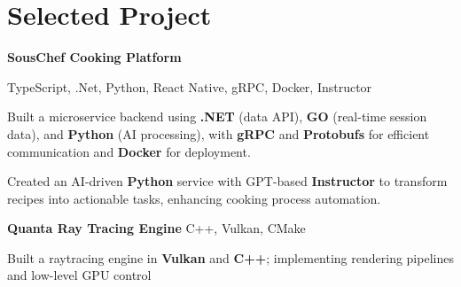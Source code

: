 
\newenvironment{twocolentry_proj}[2][]{
    \onecolentry
    \def\secondColumn{#2}
    \setcolumnwidth{\fill, 9 cm}
    \begin{paracol}{2}
}{
    \switchcolumn \raggedleft \secondColumn
    \end{paracol}
    \endonecolentry
} %

\vspace{5 pt - 0.4 cm}
\section{Selected Project}
\begin{twocolentry_proj}{
    \mbox{}%
}

\textbf{SousChef Cooking Platform}
\end{twocolentry_proj}

\vspace{0.10 cm}
\begin{onecolentry}
    \small TypeScript, .Net, Python, React Native, gRPC, Docker, Instructor 
    \begin{highlights}
        \item Built a microservice backend using  \textbf{.NET} (data API),  \textbf{GO} (real-time session data), and  \textbf{Python} (AI processing), with \textbf{gRPC} and \textbf{Protobufs} for efficient communication and \textbf{Docker} for deployment.
        \item Created an AI-driven  \textbf{Python} service with GPT-based \textbf{Instructor} to transform recipes into actionable tasks, enhancing cooking process automation.
    \end{highlights}
\end{onecolentry}


\vspace{0.10 cm}
\begin{twocolentry_proj}{
    \mbox{}%
}
\textbf{Quanta Ray Tracing Engine} C++, Vulkan, CMake
\end{twocolentry_proj}
\begin{onecolentry}
    \begin{highlights}
        \item Built a raytracing engine in \textbf{Vulkan} and \textbf{C++}; implementing rendering pipelines and low-level GPU control
    \end{highlights}
\end{onecolentry}